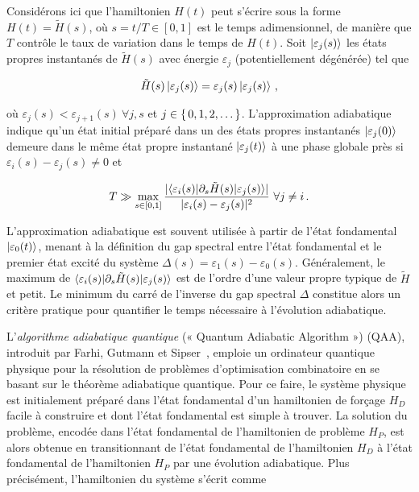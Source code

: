 Considérons ici que l'hamiltonien $H(t)$ peut s'écrire sous la forme $H(t) = \tilde{H}(s)$, où $s=t/T \in [0,1]$ est le temps adimensionnel, de manière que $T$ contrôle le taux de variation dans le temps de $H(t)$. Soit $\ket{\varepsilon_{j} (s)}$ les états propres instantanés de $\tilde{H}(s)$ avec énergie $\varepsilon_{j}$ (potentiellement dégénérée) tel que

\begin{equation}
   \tilde{H}(s) \ket{\varepsilon_{j}(s)} = \varepsilon_{j}(s) \ket{\varepsilon_{j}(s)} \,,
\end{equation}

où $\varepsilon_{j}(s) < \varepsilon_{j+1}(s) \ \forall j,s$ et $j \in \set{ 0, 1, 2, \dots }$. L'approximation adiabatique indique qu'un état initial préparé dans un des états propres instantanés $\ket{\varepsilon_{j}(0)}$ demeure dans le même état propre instantané $\ket{\varepsilon_{j}(t)}$ à une phase globale près si $\varepsilon_{i}(s) - \varepsilon_{j}(s) \neq  0$ et

\begin{equation}
    T \gg \max_{s \in [0,1]} \frac{\lvert \braket{ \varepsilon_{i}(s) | \partial_{s} \tilde{H}(s) | \varepsilon_{j}(s) } \rvert }{\lvert \varepsilon_{i}(s) - \varepsilon_{j}(s) \rvert^{2} } \ \forall j \neq i \,.
\end{equation}


L'approximation adiabatique est souvent utilisée à partir de l'état fondamental $\ket{\varepsilon_{0}(t)}$, menant à la définition du gap spectral entre l'état fondamental et le premier état excité du système $\Delta(s) = \varepsilon_{1}(s) - \varepsilon_{0}(s)$. Généralement, le maximum de $\braket{ \varepsilon_{i}(s) | \partial_{s} \tilde{H}(s) | \varepsilon_{j}(s)}$ est de l'ordre d'une valeur propre typique de $\tilde{H}$ et petit. Le minimum du carré de l'inverse du gap spectral $\Delta$ constitue alors un critère pratique pour quantifier le temps nécessaire à l'évolution adiabatique.


L'\textit{algorithme adiabatique quantique} (« Quantum Adiabatic Algorithm ») (QAA), introduit par Farhi, Gutmann et Sipser~\cite{farhiQuantumComputationAdiabatic2000}, emploie un ordinateur quantique physique pour la résolution de problèmes d'optimisation combinatoire en se basant sur le théorème adiabatique quantique. Pour ce faire, le système physique est initialement préparé dans l'état fondamental d'un hamiltonien de forçage $H_{D}$ facile à construire et dont l'état fondamental est simple à trouver. La solution du problème, encodée dans l'état fondamental de l'hamiltonien de problème $H_{P}$, est alors obtenue en transitionnant de l'état fondamental de l'hamiltonien $H_{D}$ à l'état fondamental de l'hamiltonien $H_{P}$ par une évolution adiabatique. Plus précisément, l'hamiltonien du système s'écrit comme


